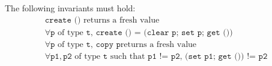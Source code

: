 \begin{important}
The following invariants must
hold:\footnotemark
\begin{gather}
\texttt{create ()} \mbox{ returns a fresh value} \label{eq:create}\\
\forall \texttt{p} \mbox{ of type } \texttt{t},\,
\texttt{create () = (clear p; set p; get ())}\label{eq:clear}\\
\forall \texttt{p} \mbox{ of type } \texttt{t},\, \texttt{copy p} \mbox{
  returns a fresh value}
\label{eq:copy}\\
\forall \texttt{p1},\texttt{p2} \mbox{ of type } \texttt{t}
\mbox{ such that } \texttt{p1 != p2},\, \texttt{(set p1; get ()) != p2}
\label{eq:independance}
\end{gather}
\end{important}

